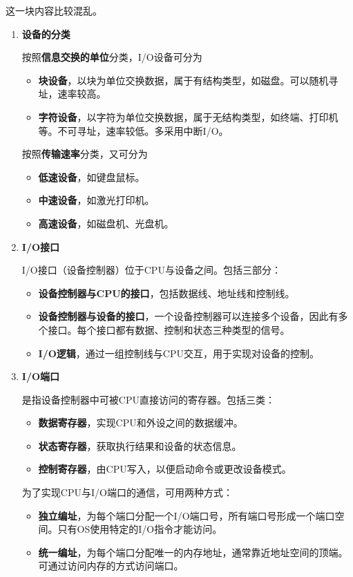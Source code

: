 \documentclass[12pt, a4paper, oneside]{ctexart}
\begin{document}
这一块内容比较混乱。

\begin{enumerate}
  \item {\bf 设备的分类}
  
  按照\textbf{信息交换的单位}分类，I/O设备可分为
  \begin{itemize}
    \item {\bf 块设备}，以块为单位交换数据，属于有结构类型，如磁盘。可以随机寻址，速率较高。
    \item {\bf 字符设备}，以字符为单位交换数据，属于无结构类型，如终端、打印机等。不可寻址，速率较低。多采用中断I/O。
  \end{itemize}
  
  按照\textbf{传输速率}分类，又可分为
  \begin{itemize}
    \item {\bf 低速设备}，如键盘鼠标。
    \item {\bf 中速设备}，如激光打印机。
    \item {\bf 高速设备}，如磁盘机、光盘机。
  \end{itemize}

  \item {\bf I/O接口}
  
  I/O接口（设备控制器）位于CPU与设备之间。包括三部分：
  \begin{itemize}
    \item {\bf 设备控制器与CPU的接口}，包括数据线、地址线和控制线。
    \item {\bf 设备控制器与设备的接口}，一个设备控制器可以连接多个设备，因此有多个接口。每个接口都有数据、控制和状态三种类型的信号。
    \item {\bf I/O逻辑}，通过一组控制线与CPU交互，用于实现对设备的控制。
  \end{itemize}

  \item {\bf I/O端口}
  
  是指设备控制器中可被CPU直接访问的寄存器。包括三类：
  \begin{itemize}
    \item {\bf 数据寄存器}，实现CPU和外设之间的数据缓冲。
    \item {\bf 状态寄存器}，获取执行结果和设备的状态信息。
    \item {\bf 控制寄存器}，由CPU写入，以便启动命令或更改设备模式。
  \end{itemize}

  为了实现CPU与I/O端口的通信，可用两种方式：
  \begin{itemize}
    \item {\bf 独立编址}，为每个端口分配一个I/O端口号，所有端口号形成一个端口空间。只有OS使用特定的I/O指令才能访问。
    \item {\bf 统一编址}，为每个端口分配唯一的内存地址，通常靠近地址空间的顶端。可通过访问内存的方式访问端口。
  \end{itemize}


\end{enumerate}
\end{document}
